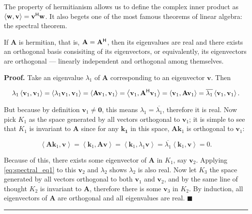 	The property of hermitianism allows us to define the complex inner product as $\left<\mathbf{w,v}\right> = \mathbf{v}^{\mathsf{H}} \mathbf{w}$. It also begets one of the most famous theorems of linear algebra: the spectral theorem.

\begin{theorem}\label{theo:spectral_theorem} %
	If $\mathbf{A}$ is hermitian, that is, $\mathbf{A} = \mathbf{A}^{\mathsf{H}}$, then its eigenvalues are real and there exists an orthogonal basis consisiting of its eigenvectors, or equivalently, its eigenvectors are orthogonal — linearly independent and orthogonal among themselves.
\end{theorem}
\noindent\textbf{Proof.} Take an eigenvalue $\lambda_1$ of $\mathbf{A}$ corresponding to an eigenvector $\mathbf{v}$. Then

\begin{equation} \lambda_1\left<\mathbf{v}_1,\mathbf{v}_1\right> = \left<\lambda_1\mathbf{v}_1,\mathbf{v}_1\right> = \left<\mathbf{A}\mathbf{v}_1,\mathbf{v}_1\right> = \left<\mathbf{v}_1,\mathbf{A}^{\mathsf{H}}\mathbf{v}_1\right> = \left<\mathbf{v}_1,\mathbf{A}\mathbf{v}_1\right> = \overline{\lambda_1}\left<\mathbf{v}_1,\mathbf{v}_1\right> . \label{eq:spectral_eq1}\end{equation}

	But because by definition $\mathbf{v}_1\neq\mathbf{0}$, this means $\lambda_1 = \overline{\lambda_1}$, therefore it is real. Now pick $K_1$ as the space generated by all vectors orthogonal to $\mathbf{v}_1$; it is simple to see that $K_1$ is invariant to $\mathbf{A}$ since for any $\mathbf{k_1}$ in this space, $\mathbf{Ak}_1$ is orthogonal to $\mathbf{v}_1$:

\begin{equation} \left<\mathbf{Ak}_1,\mathbf{v}\right> = \left<\mathbf{k}_1,\mathbf{Av}\right> = \left<\mathbf{k}_1,\lambda_1\mathbf{v}\right> = \overline{\lambda_1}\left<\mathbf{k}_1,\mathbf{v}\right> = 0 . \end{equation}

	Because of this, there exists some eigenvector of $\mathbf{A}$ in $K_1$, say $\mathbf{v}_2$. Applying \eqref{eq:spectral_eq1} to this $\mathbf{v}_2$ and $\lambda_2$ shows $\lambda_2$ is also real. Now let $K_3$ the space generated by all vectors orthogonal to both $\mathbf{v}_1$ and $\mathbf{v}_2$, and by the same line of thought $K_2$ is invariant to $\mathbf{A}$, therefore there is some $\mathbf{v}_3$ in $K_2$. By induction, all eigenvectors of $\mathbf{A}$ are orthogonal and all eigenvalues are real.
\hfill$\blacksquare$
\vspace{5mm}
\hrule
\vspace{5mm} %

